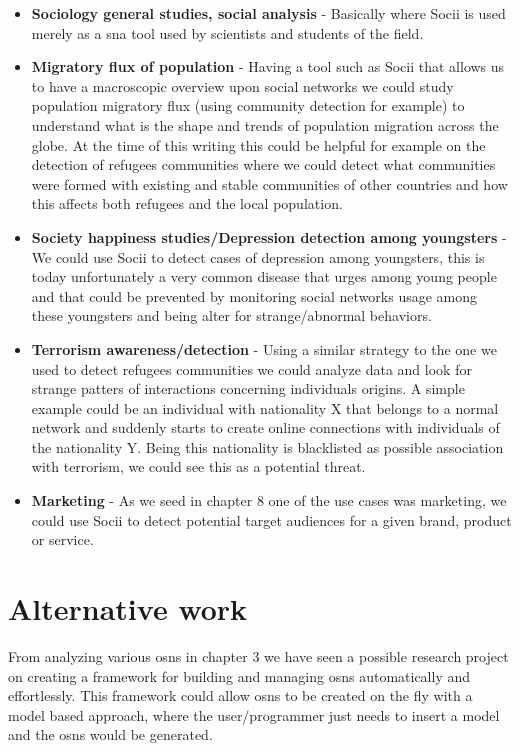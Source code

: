 \begin{itemize}
    \item \textbf{Sociology general studies, social analysis} - Basically where Socii is used merely as a \gls{sna} tool used by scientists and students of the field.
    \item \textbf{Migratory flux of population} - Having a tool such as Socii that allows us to have a macroscopic overview upon social networks we could study population migratory flux (using community detection for example) to understand what is the shape and trends of population migration across the globe. At the time of this writing this could be helpful for example on the detection of refugees communities where we could detect what communities were formed with existing and stable communities of other countries and how this affects both refugees and the local population.
    \item \textbf{Society happiness studies/Depression detection among youngsters} - We could use Socii to detect cases of depression among youngsters, this is today
    unfortunately a very common disease that urges among young people and that could be prevented by monitoring social networks usage among these youngsters and being alter
    for strange/abnormal behaviors.
    \item \textbf{Terrorism awareness/detection} - Using a similar strategy to the one we used to detect refugees communities we could analyze data and look for strange patters of interactions concerning individuals origins. A simple example could be an individual with nationality X that belongs to a normal network and suddenly starts to create online connections with individuals of the nationality Y. Being this nationality is blacklisted as possible association with terrorism, we could see this as a potential threat.
    \item \textbf{Marketing} - As we seed in chapter 8 one of the use cases was marketing, we could use Socii to detect potential target audiences for a given brand, product or service.
\end{itemize}

\section{Alternative work}
From analyzing various \glspl{osn} in chapter 3 we have seen a possible research project on creating a framework for building
and managing \glspl{osn} automatically and effortlessly. This framework could allow \glspl{osn} to be created on the fly with a model based approach, where the user/programmer
just needs to insert a model and the \glspl{osn} would be generated.

